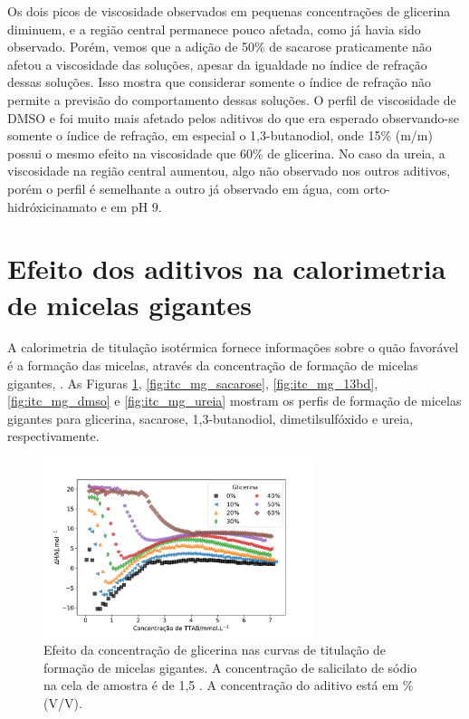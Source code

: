 			Os dois picos de viscosidade observados em pequenas concentrações de glicerina diminuem, e a região central permanece pouco afetada, como já havia sido observado.\cite{Hoffmann2010} Porém, vemos que a adição de 50\% de sacarose praticamente não afetou a viscosidade das soluções, apesar da igualdade no índice de refração dessas soluções. Isso mostra que considerar somente o índice de refração não permite a previsão do comportamento dessas soluções. O perfil de viscosidade de DMSO e \BD{} foi muito mais afetado pelos aditivos do que era esperado observando-se somente o índice de refração, em especial o 1,3-butanodiol, onde 15\% (m/m) possui o mesmo efeito na viscosidade que 60\% de glicerina. No caso da ureia, a viscosidade na região central aumentou, algo não observado nos outros aditivos, porém o perfil é semelhante a outro já observado em água, com orto-hidróxicinamato e \CTAB{} em pH 9. \cite{Clinckspoor2015}
			
		\FloatBarrier
		
		\section{Efeito dos aditivos na calorimetria de micelas gigantes}  
		\label{sec:efeito_aditivos_calorimetria_mg}
			A calorimetria de titulação isotérmica fornece informações sobre o quão favorável é a formação das micelas, através da concentração de formação de micelas gigantes, \cwlm. As Figuras \ref{fig:itc_mg_glicerina}, \ref{fig:itc_mg_sacarose}, \ref{fig:itc_mg_13bd}, \ref{fig:itc_mg_dmso} e \ref{fig:itc_mg_ureia} mostram os perfis de formação de micelas gigantes para glicerina, sacarose, 1,3-butanodiol, dimetilsulfóxido e ureia, respectivamente.
		
			\begin{figure}[h]
				\centering
				\includegraphics[width=0.7\textwidth]{imagens/itc/ITC_MG_glic}
				\caption{Efeito da concentração de glicerina nas curvas de titulação de formação de micelas gigantes. A concentração de salicilato de sódio na cela de amostra é de 1,5 \mM. A concentração do aditivo está em \% (V/V).}
				\label{fig:itc_mg_glicerina}
			\end{figure}  
			
